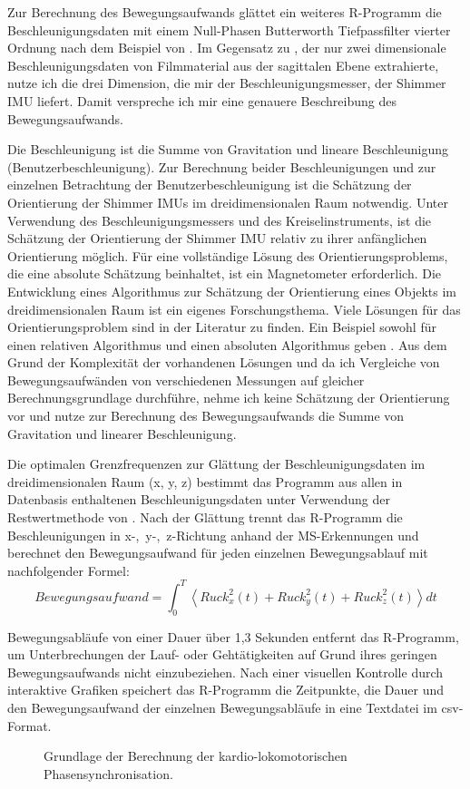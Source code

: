 Zur Berechnung des Bewegungsaufwands glättet ein weiteres R-Programm die Beschleunigungsdaten mit einem Null-Phasen Butterworth Tiefpassfilter vierter Ordnung nach dem Beispiel von \citet{Hreljac2000}. Im Gegensatz zu \citet{Hreljac2000}, der nur zwei dimensionale Beschleunigungsdaten von Filmmaterial aus der sagittalen Ebene extrahierte, nutze ich die drei Dimension, die mir der Beschleunigungsmesser, der Shimmer \ac{IMU} liefert. Damit verspreche ich mir eine genauere Beschreibung des Bewegungsaufwands.

Die Beschleunigung ist die Summe von Gravitation und lineare Beschleunigung (Benutzerbeschleunigung). Zur Berechnung beider Beschleunigungen und zur einzelnen Betrachtung der Benutzerbeschleunigung ist die Schätzung der Orientierung der Shimmer \acp{IMU} im dreidimensionalen Raum notwendig. Unter Verwendung des Beschleunigungsmessers und des Kreiselinstruments, ist die Schätzung der Orientierung der Shimmer \ac{IMU} relativ zu ihrer anfänglichen Orientierung möglich. Für eine vollständige Lösung des Orientierungsproblems, die eine absolute Schätzung beinhaltet, ist ein Magnetometer erforderlich. Die Entwicklung eines Algorithmus zur Schätzung der Orientierung eines Objekts im dreidimensionalen Raum ist ein eigenes Forschungsthema. Viele Lösungen für das Orientierungsproblem sind in der Literatur zu finden. Ein Beispiel sowohl für einen relativen Algorithmus und einen absoluten Algorithmus geben \citet{Madgwick2011}. Aus dem Grund der Komplexität der vorhandenen Lösungen und da ich Vergleiche von Bewegungsaufwänden von verschiedenen Messungen auf gleicher Berechnungsgrundlage durchführe, nehme ich keine Schätzung der Orientierung vor und nutze zur Berechnung des Bewegungsaufwands die Summe von Gravitation und linearer Beschleunigung.

Die optimalen Grenzfrequenzen zur Glättung der Beschleunigungsdaten im dreidimensionalen Raum (x, y, z) bestimmt das Programm aus allen in Datenbasis enthaltenen Beschleunigungsdaten unter Verwendung der Restwertmethode von \citet{Wells1980}. Nach der Glättung trennt das R-Programm die Beschleunigungen in \mbox{x-, y-, z-Richtung} anhand der \ac{MS}-Erkennungen und berechnet den Bewegungsaufwand für jeden einzelnen Bewegungsablauf mit nachfolgender Formel: 
\begin{equation}
	Bewegungsaufwand = \int^T_0 \left\langle {Ruck^2_{x}(t) + Ruck^2_{y}(t) + Ruck^2_{z}(t)}\right\rangle dt 
\end{equation}

Bewegungsabläufe von einer Dauer über 1,3 Sekunden entfernt das R-Programm, um Unterbrechungen der Lauf- oder Gehtätigkeiten auf Grund ihres geringen Bewegungsaufwands nicht einzubeziehen. Nach einer visuellen Kontrolle durch interaktive Grafiken speichert das R-Programm die Zeitpunkte, die Dauer und den Bewegungsaufwand der einzelnen Bewegungsabläufe in eine Textdatei im \acs{csv}-Format. 
\begin{figure}
	[!htb]  \caption[Grundlage der Berechnung der kardio-lokomotorischen Phasensynchronisation]{Grundlage der Berechnung der kardio-lokomotorischen Phasensynchronisation.} \label{fig:grundlage_klps} 
\end{figure}

